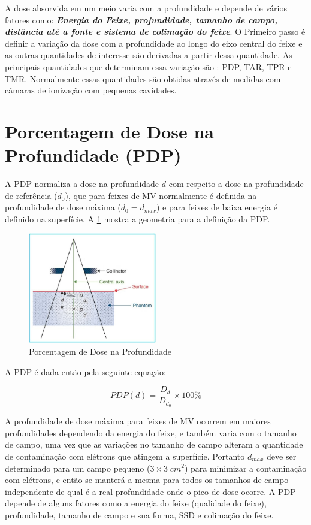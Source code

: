 \documentclass[11pt,a4paper]{article}
\begin{document}
	A dose absorvida em um meio varia com a profundidade e depende de vários fatores como: \textit{\textbf{Energia do Feixe, profundidade, tamanho de campo, distância até a fonte e sistema de colimação do feixe}}. O Primeiro passo é definir a variação da dose com a profundidade ao longo do eixo central do feixe e as outras quantidades de interesse são derivadas a partir dessa quantidade. As principais quantidades que determinam essa variação são : PDP, TAR, TPR e TMR. Normalmente essas quantidades são obtidas através de medidas com câmaras de ionização com pequenas cavidades. 

	\section{Porcentagem de Dose na Profundidade (PDP)}

	A PDP normaliza a dose na profundidade $d$ com respeito a dose na profundidade de referência ($d_0$), que para feixes de MV normalmente é definida na profundidade de dose máxima ($d_0 = d_{max}$) e para feixes de baixa energia é definido na superfície. A \ref{fig:pdp} mostra a geometria para a definição da PDP.

		\begin{figure}[h]
			\centering
			\includegraphics[width=0.5\textwidth]{Imagens/pdp.JPG}
			\caption{Porcentagem de Dose na Profundidade}
			\label{fig:pdp}
		\end{figure}

	A PDP é dada então pela seguinte equação:

		\begin{equation}
			PDP(d) = \frac{D_d}{D_{d_0}} \times 100 \%
		\end{equation}

	
	A profundidade de dose máxima para feixes de MV ocorrem em maiores profundidades dependendo da energia do feixe, e também varia com o tamanho de campo, uma vez que as variações no tamanho de campo alteram a quantidade de contaminação com elétrons que atingem a superfície. Portanto $d_{max}$ deve ser determinado para um campo pequeno ($3 \times 3 \; cm^2$) para minimizar a contaminação com elétrons, e então se manterá a mesma para todos os tamanhos de campo independente de qual é a real profundidade onde o pico de dose ocorre. A PDP depende de alguns fatores como a energia do feixe (qualidade do feixe), profundidade, tamanho de campo e sua forma, SSD e colimação do feixe. 
\end{document}
